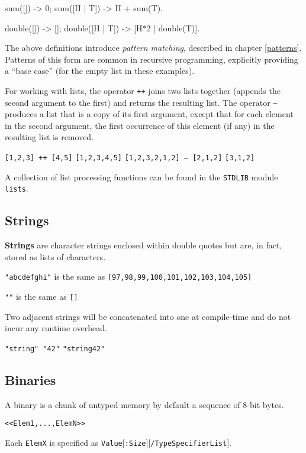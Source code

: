 \begin{erlang}
sum([]) -> 0;
sum([H | T]) -> H + sum(T).

double([]) -> [];
double([H | T]) -> [H*2 | double(T)].
\end{erlang}

The above definitions introduce \textit{pattern matching}, described in chapter \ref{patterns}.  Patterns of this form are common in recursive programming,
explicitly providing a ``base case'' (for the empty list in these examples).

For working with lists, the operator \texttt{++} joins two lists together (appends the second argument to the first) and
returns the resulting list.  The operator \texttt{--} produces a list that
is a copy of its first argument, except that for each element in
the second argument, the first occurrence of this element (if any) in the resulting list is
removed.

\texttt{[1,2,3] ++ [4,5]} \resultingin \texttt{[1,2,3,4,5]}
\texttt{[1,2,3,2,1,2] -- [2,1,2]} \resultingin \texttt{[3,1,2]}

A collection of list processing functions can be found in the
\texttt{STDLIB} module \texttt{lists}.


\subsection{Strings}
\label{datatypes:string}
\textbf{Strings} are character strings enclosed within double quotes
but are, in fact, stored as lists of characters.

\texttt{"abcdefghi"} is the same as \texttt{[97,98,99,100,101,102,103,104,105]}

\texttt{""} is the same as \texttt{[]}

Two adjacent strings will be concatenated into one at compile-time and
do not incur any runtime overhead.

\texttt{"string" "42"} \resultingin \texttt{"string42"}


\subsection{Binaries}
\label{datatypes:binary}
A binary is a chunk of untyped memory by default a sequence of 8-bit
bytes.

\texttt{<}\texttt{<Elem1,...,ElemN>}\texttt{>}

Each \texttt{ElemX} is specified as \texttt{Value}[\texttt{:Size}][\texttt{/TypeSpecifierList}].

